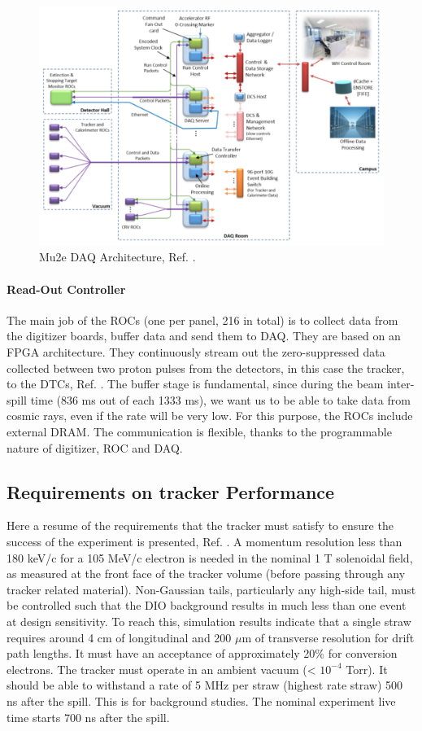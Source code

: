 \begin{figure}[!h]
    \centering
    \includegraphics[width =\textwidth]{figures/png/Screenshot_20240206_144803.png}
    \caption{Mu2e DAQ Architecture, Ref. \cite{GIOIOSA2023167732}.}
    \label{fig:linktodaq}
    \end{figure}
\paragraph{Read-Out Controller}\label{ROC} 
The main job of the ROCs (one per panel, 216 in total) 
is to collect data from the digitizer boards, buffer data and 
send them to DAQ. They are based on an FPGA architecture. They 
continuously stream out the zero-suppressed data collected between 
two proton pulses from the detectors, in this case the tracker, to 
the DTCs, Ref. \cite{GIOIOSA2023167732}. The buffer 
stage is fundamental, since during the beam inter-spill time (836 ms 
out of each 1333 ms), we want us to be able to take data from cosmic 
rays, even if the rate will be very low. For this purpose, the ROCs 
include external DRAM. The communication is flexible, thanks to the 
programmable nature of digitizer, ROC and DAQ. 

\subsection{Requirements on tracker Performance}
Here a resume of the requirements that the tracker must satisfy to ensure the success of the experiment is presented, Ref. \cite{trkreq}.
A momentum resolution less than 180 keV/c for a 105 MeV/c electron is needed in the nominal
1 T solenoidal field, as measured at the front face of the tracker volume (before
passing through any tracker related material). Non-Gaussian tails, particularly any
high-side tail, must be controlled such that the DIO background results in much less
than one event at design sensitivity. To reach this, simulation results indicate that 
a single straw requires around 4 cm of longitudinal and 200 $\mu$m of transverse resolution for drift path lengths. 
It must have an acceptance of approximately 20\% for conversion electrons.
The tracker must operate in an ambient vacuum (< $10^{-4}$ Torr).
It should be able to withstand a rate of 5 MHz per straw (highest rate straw) 500 ns after the spill. This is
for background studies. The nominal experiment live time starts 700 ns after the spill.

